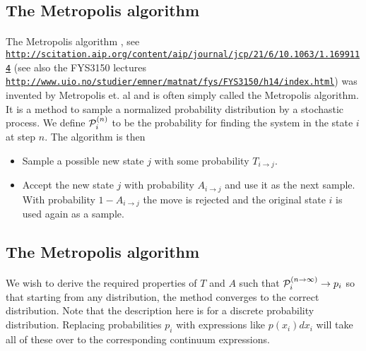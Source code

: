 \documentclass[%
twoside,                 %
final,                   %
10pt]{article}
\begin{document}
\noindent




\subsection{The Metropolis algorithm}

\paragraph{}
The Metropolis algorithm , see \href{{http://scitation.aip.org/content/aip/journal/jcp/21/6/10.1063/1.1699114}}{\nolinkurl{http://scitation.aip.org/content/aip/journal/jcp/21/6/10.1063/1.1699114}}  (see also the FYS3150 lectures \href{{http://www.uio.no/studier/emner/matnat/fys/FYS3150/h14/index.html}}{\nolinkurl{http://www.uio.no/studier/emner/matnat/fys/FYS3150/h14/index.html}})
was invented by Metropolis et. al
and is often simply called the Metropolis algorithm.
It is a method to sample a normalized probability
distribution by a stochastic process. We define ${\cal P}_i^{(n)}$ to
be the probability for finding the system in the state $i$ at step $n$.
The algorithm is then

\begin{itemize}
\item Sample a possible new state $j$ with some probability $T_{i\rightarrow j}$.

\item Accept the new state $j$ with probability $A_{i \rightarrow j}$ and use it as the next sample. With probability $1-A_{i\rightarrow j}$ the move is rejected and the original state $i$ is used again as a sample.
\end{itemize}

\noindent




\subsection{The Metropolis algorithm}

\paragraph{}
We wish to derive the required properties of $T$ and $A$ such that
${\cal P}_i^{(n\rightarrow \infty)} \rightarrow p_i$ so that starting
from any distribution, the method converges to the correct distribution.
Note that the description here is for a discrete probability distribution.
Replacing probabilities $p_i$ with expressions like $p(x_i)dx_i$ will
take all of these over to the corresponding continuum expressions.
\end{document}
